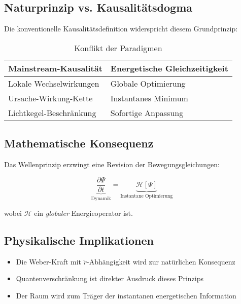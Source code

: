 \subsection{Naturprinzip vs. Kausalitätsdogma}
Die konventionelle Kausalitätsdefinition widerspricht diesem Grundprinzip:

\begin{table}[ht]
    \centering
    \begin{tabular}{ll}
        \toprule
        \textbf{Mainstream-Kausalität} & \textbf{Energetische Gleichzeitigkeit} \\
        \midrule
        Lokale Wechselwirkungen & Globale Optimierung \\
        Ursache-Wirkung-Kette & Instantanes Minimum \\
        Lichtkegel-Beschränkung & Sofortige Anpassung \\
        \bottomrule
    \end{tabular}
    \caption{Konflikt der Paradigmen}
\end{table}

\subsection{Mathematische Konsequenz}
Das Wellenprinzip erzwingt eine Revision der Bewegungsgleichungen:

\begin{equation}
    \underbrace{\frac{\partial \Psi}{\partial t}}_{\text{Dynamik}} = 
    \underbrace{\mathcal{H}[\Psi]}_{\text{Instantane Optimierung}}
\end{equation}

wobei $\mathcal{H}$ ein \emph{globaler} Energieoperator ist.

\subsection{Physikalische Implikationen}
\begin{itemize}
    \item Die Weber-Kraft mit $\ddot{r}$-Abhängigkeit wird zur natürlichen Konsequenz
    \item Quantenverschränkung ist direkter Ausdruck dieses Prinzips
    \item Der Raum wird zum Träger der instantanen energetischen Information
\end{itemize}

